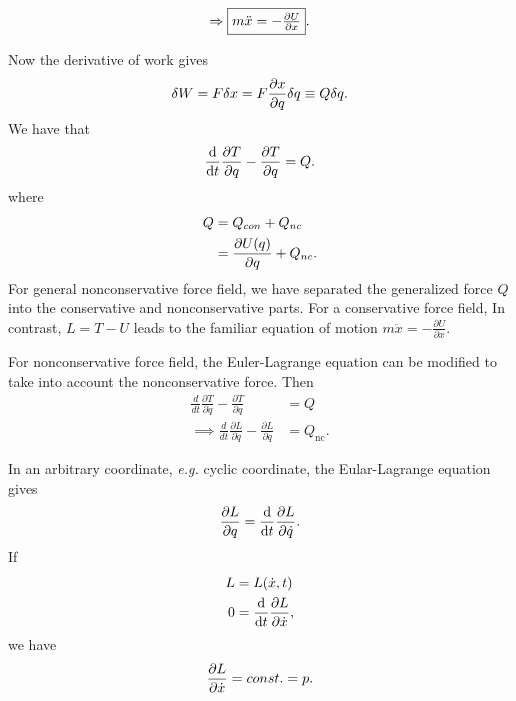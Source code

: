 \begin{equation}
\Rightarrow \fbox{$m\ddot{x}=-\frac{\partial U}{\partial x}$}.
\end{equation}


Now the derivative of work gives
\begin{align}
\delta W= F\delta x= F\frac{\partial {x}}{\partial {q}}\delta q \equiv Q\delta q.
\end{align}
We have that
\begin{align}
\frac{{\mathrm d} {}}{{\mathrm d}t} \frac{\partial {T}}{\partial {q}}- \frac{\partial {T}}{\partial {q}}=Q.
\end{align}
where 
\begin{align}
Q &= Q_{con}+Q_{nc}\\
&= \frac{\partial {U(q)}}{\partial {q}}+ Q_{nc}.
\end{align}
For general nonconservative
force field, we have separated the generalized force
$Q$ into the conservative and nonconservative parts.  For a conservative force field, In contrast, $L=T-U$ leads to the familiar equation
of motion $m\ddot{x}=-\frac{\partial U}{\partial x}$. 

For nonconservative
force field, the Euler-Lagrange equation can be modified to take into
account the nonconservative force.  
Then
\begin{align}
\frac{d}{dt}\frac{\partial T}{\partial\dot{q}}-\frac{\partial T}{\partial q} & =Q\\
\implies\frac{d}{dt}\frac{\partial L}{\partial\dot{q}}-\frac{\partial L}{\partial q} & =Q_{\mbox{nc}}.
\end{align}

In an arbitrary coordinate, \textit{e.g.} cyclic coordinate, the Eular-Lagrange equation gives
\begin{align}
\frac{\partial {L}}{\partial {q}}=\frac{{\mathrm d} {}}{{\mathrm d}t} \frac{\partial {L}}{\partial {\dot{q}}}.
\end{align}
If
\begin{align}
L &=L(\dot{x},t)\\
0 &=\frac{{\mathrm d} {}}{{\mathrm d}t} \frac{\partial {L}}{\partial {\dot{x}}},
\end{align}
we have
\begin{align}
\frac{\partial {L}}{\partial {\dot{x}}}=const.=p.
\end{align}

